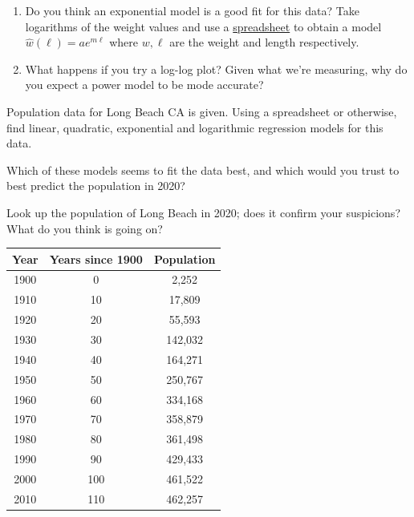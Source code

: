 \begin{exercises}{}{}
\begin{enumerate}
\begin{minipage}[t]{0.54\linewidth}
			\vspace{-5pt}
			\begin{enumerate}
		  	\item Do you think an exponential model is a good fit for this data? Take logarithms of the weight values and use a \href{http://math.uci.edu/~ndonalds/math8/fishdata.xlsx}{spreadsheet} to obtain a model $\hat w(\ell)=ae^{m\ell}$ where $w,\ell$ are the weight and length respectively.
		  	\item What happens if you try a log-log plot? Given what we're measuring, why do you expect a power model to be mode accurate?
			\end{enumerate}
		\end{minipage}
		\medbreak
	  
	  
		\begin{minipage}[t]{0.52\linewidth}\vspace{0pt}
	  	\item Population data for Long Beach CA is given.\smallbreak
	   	Using a spreadsheet or otherwise, find linear, quadratic, exponential and logarithmic regression models for this data.\par
	   	Which of these models seems to fit the data best, and which would you trust to best predict the population in 2020?\par
	   	Look up the population of Long Beach in 2020; does it confirm your suspicions? What do you think is going on?
		\end{minipage}
		\hfill
		\begin{minipage}[t]{0.45\linewidth}\vspace{0pt}
	  	\flushright\begin{tabular}{c|c|c}
			  Year&Years since 1900&Population\\\hline
			  1900&0&2,252\\
			  1910&10&17,809\\
				1920&20&55,593\\
				1930&30&142,032\\
				1940&40&164,271\\
				1950&50&250,767\\
				1960&60&334,168\\
				1970&70&358,879\\
				1980&80&361,498\\
				1990&90&429,433\\
				2000&100&461,522\\
				2010&110&462,257%
	  	\end{tabular}
		\end{minipage}
	  

\end{enumerate}
\end{exercises}
